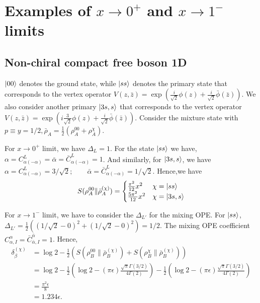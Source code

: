 \documentclass[11pt]{article}
\newcommand{\ep}{\epsilon}
\newcommand{\lb}{\left(}
\newcommand{\rb}{\right)}
\begin{document}
\section{\texorpdfstring{Examples of $x\to 0^+$ and $x\to 1^-$ limits}
{Examples of x->0+ and x->1- limits}}

\subsection{Non-chiral compact free boson 1D}
$\ket{00}$ denotes the ground state, while $\ket{ss}$ denotes the primary state that corresponds to the vertex operator $V(z,\bar z) = \exp \lb \frac{i}{\sqrt{2}}\phi(z) + \frac{i}{\sqrt{2}}\bar \phi(\bar z) \rb$. We also consider another primary $\ket{3s,s}$ that corresponds to the vertex operator $V(z,\bar z) = \exp \lb i\frac{3}{\sqrt{2}}\phi(z) + \frac{i}{\sqrt{2}}\bar \phi(\bar z) \rb$.
Consider the mixture state with $p\equiv y=1/2, \bar \rho_A = \frac{1}{2}\lb \rho_A^{00} + \rho_A^\chi \rb$. 

For $x \to 0^+$ limit, we have $\Delta_L =1$. For the state $\ket{ss}$ we have,  $\alpha = C_{\alpha (-\alpha)}^L =  \bar \alpha = \bar C _{\alpha(- \alpha)}^L = 1 $. And similarly, for $\ket{3s,s}$, we have  $\alpha = C_{\alpha (-\alpha)}^L = 3/\sqrt{2}; \qquad  \bar \alpha = \bar C _{\alpha(- \alpha)}^L = 1/\sqrt{2} $. Hence,we have
\begin{align}
    S(\rho_A^{00}\| \bar \rho_A^{(\chi)}) = \begin{cases}
        \frac{\pi^2}{12} x^2 & \chi = \ket{ss} \\
        \frac{5\pi^2 }{12}x^2 & \chi = \ket{3s,s}
    \end{cases}
\end{align}

For $x \to 1^-$ limit, we have to consider the $\Delta_{L'}$ for the mixing OPE. For $\ket{ss}$, $\Delta_{L'} = \frac{1}{2}\lb \lb 1/\sqrt{2} -0\rb^2 + \lb 1/\sqrt{2} -0\rb^2 \rb= 1/2$. The mixing OPE coefficient $C_{\alpha ,I}^\alpha = \bar C_{\bar \alpha, I}^{\bar \alpha} = 1$. Hence, 
\begin{align}
    \delta_\beta^{(\chi)} &= \log 2 - \frac{1}{2}\lb S(\rho_B^{00} \| \bar \rho^{(\chi)}_B  ) + S(\rho^\chi_B \| \bar \rho ^{(\chi)}_B)   \rb  \\&= \log 2 - \frac{1}{2}\lb \log 2 - (\pi \ep) \frac{\sqrt{\pi} \Gamma(3/2)}{4\Gamma(2)}\rb - \frac{1}{2}\lb  \log 2 - (\pi \ep) \frac{\sqrt{\pi} \Gamma(3/2)}{4\Gamma(2)}\rb \\
    &= \frac{\pi^2\ep}{8} \\
    &= 1.234 \ep. 
\end{align}
\end{document}
